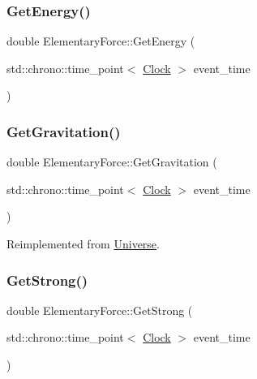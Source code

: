 \subsubsection{\texorpdfstring{Get\+Energy()}{GetEnergy()}}
{\footnotesize\ttfamily double Elementary\+Force\+::\+Get\+Energy (\begin{DoxyParamCaption}\item[{std\+::chrono\+::time\+\_\+point$<$ \mbox{\hyperlink{universe_8h_a0ef8d951d1ca5ab3cfaf7ab4c7a6fd80}{Clock}} $>$}]{event\+\_\+time }\end{DoxyParamCaption})}

\mbox{\label{classElementaryForce_a579afb8079668f0587096934d1de9c04}} 
\subsubsection{\texorpdfstring{Get\+Gravitation()}{GetGravitation()}}
{\footnotesize\ttfamily double Elementary\+Force\+::\+Get\+Gravitation (\begin{DoxyParamCaption}\item[{std\+::chrono\+::time\+\_\+point$<$ \mbox{\hyperlink{universe_8h_a0ef8d951d1ca5ab3cfaf7ab4c7a6fd80}{Clock}} $>$}]{event\+\_\+time }\end{DoxyParamCaption})\hspace{0.3cm}{\ttfamily [virtual]}}



Reimplemented from \mbox{\hyperlink{classUniverse_ab0404e774ee0ed66b597ff5b8e989446}{Universe}}.

\mbox{\label{classElementaryForce_aaa1cde27b1508831f67353eb39745a7e}} 
\subsubsection{\texorpdfstring{Get\+Strong()}{GetStrong()}}
{\footnotesize\ttfamily double Elementary\+Force\+::\+Get\+Strong (\begin{DoxyParamCaption}\item[{std\+::chrono\+::time\+\_\+point$<$ \mbox{\hyperlink{universe_8h_a0ef8d951d1ca5ab3cfaf7ab4c7a6fd80}{Clock}} $>$}]{event\+\_\+time }\end{DoxyParamCaption})\hspace{0.3cm}{\ttfamily [virtual]}}



